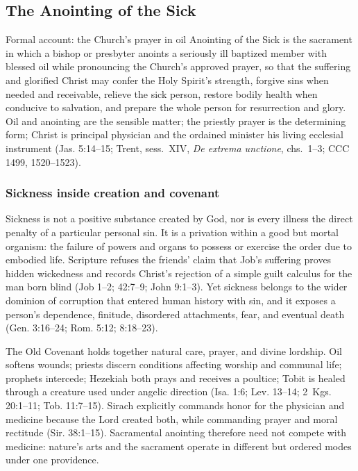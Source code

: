 \subsection{The Anointing of the Sick}

\begin{massbox}{Formal account: the Church's prayer in oil}
Anointing of the Sick is the sacrament in which a bishop or presbyter anoints a seriously ill baptized member with blessed oil while pronouncing the Church's approved prayer, so that the suffering and glorified Christ may confer the Holy Spirit's strength, forgive sins when needed and receivable, relieve the sick person, restore bodily health when conducive to salvation, and prepare the whole person for resurrection and glory. Oil and anointing are the sensible matter; the priestly prayer is the determining form; Christ is principal physician and the ordained minister his living ecclesial instrument (Jas. 5:14--15; Trent, sess.~XIV, \emph{De extrema unctione}, chs.~1--3; CCC 1499, 1520--1523).
\end{massbox}

\subsubsection{Sickness inside creation and covenant}

Sickness is not a positive substance created by God, nor is every illness the direct penalty of a particular personal sin. It is a privation within a good but mortal organism: the failure of powers and organs to possess or exercise the order due to embodied life. Scripture refuses the friends' claim that Job's suffering proves hidden wickedness and records Christ's rejection of a simple guilt calculus for the man born blind (Job 1--2; 42:7--9; John 9:1--3). Yet sickness belongs to the wider dominion of corruption that entered human history with sin, and it exposes a person's dependence, finitude, disordered attachments, fear, and eventual death (Gen. 3:16--24; Rom. 5:12; 8:18--23).

The Old Covenant holds together natural care, prayer, and divine lordship. Oil softens wounds; priests discern conditions affecting worship and communal life; prophets intercede; Hezekiah both prays and receives a poultice; Tobit is healed through a creature used under angelic direction (Isa. 1:6; Lev. 13--14; 2~Kgs. 20:1--11; Tob. 11:7--15). Sirach explicitly commands honor for the physician and medicine because the Lord created both, while commanding prayer and moral rectitude (Sir. 38:1--15). Sacramental anointing therefore need not compete with medicine: nature's arts and the sacrament operate in different but ordered modes under one providence.


